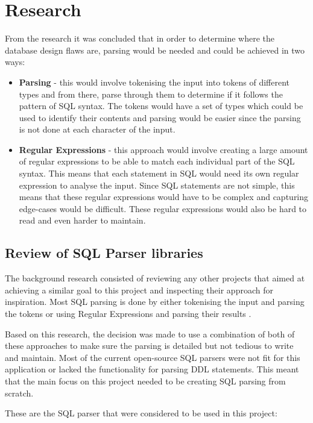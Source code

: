 \section{Research}

From the research it was concluded that in order to determine where the database design flaws are, parsing would be needed and could be achieved in two ways:

\begin{itemize}
	\item \textbf{Parsing} - this would involve tokenising the input into tokens of different types and from there, parse through them to determine if it follows the pattern of SQL syntax. The tokens would have a set of types which could be used to identify their contents and parsing would be easier since the parsing is not done at each character of the input.
	
	\item \textbf{Regular Expressions} - this approach would involve creating a large amount of regular expressions to be able to match each individual part of the SQL syntax. This means that each statement in SQL would need its own regular expression to analyse the input. Since SQL statements are not simple, this means that these regular expressions would have to be complex and capturing edge-cases would be difficult. These regular expressions would also be hard to read and even harder to maintain.
\end{itemize}

\subsection{Review of SQL Parser libraries}

The background research consisted of reviewing any other projects that aimed at achieving a similar goal to this project and inspecting their approach for inspiration. Most SQL parsing is done by either tokenising the input and parsing the tokens or using Regular Expressions and parsing their results \cite{Regex}. 

Based on this research, the decision was made to use a combination of both of these approaches to make sure the parsing is detailed but not tedious to write and maintain. Most of the current open-source SQL parsers were not fit for this application or lacked the functionality for parsing DDL statements. This meant that the main focus on this project needed to be creating SQL parsing from scratch.

These are the SQL parser that were considered to be used in this project:

